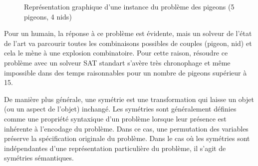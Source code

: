 \begin{figure}[!htbp]
	\centering
	\caption{Représentation graphique d'une instance du problème des pigeons (5 pigeons, 4 nids)}
	\label{fig:holefr}
\end{figure}


Pour un humain, la réponse à ce problème est évidente, mais un solveur de l'état de l'art va parcourir toutes 
les combinaisons possibles de couples (pigeon, nid) et cela le mène à une explosion combinatoire.
Pour cette raison, résoudre ce problème avec un solveur SAT standart s'avère très chronophage et même impossible dans des temps raisonnables
pour un nombre de pigeons supérieur à 15.

%
%

De manière plus  générale, une symétrie est une transformation qui laisse un objet (ou un aspect de l'objet) inchangé. Les symétries sont généralement définies comme une propriété syntaxique d'un problème lorsque leur présence est inhérente à l'encodage du problème.
Dans ce cas, une permutation des variables préserve la spécification originale du problème.
Dans le cas où les symétries sont indépendantes d'une représentation particulière du problème, il s'agit de symétries sémantiques.

